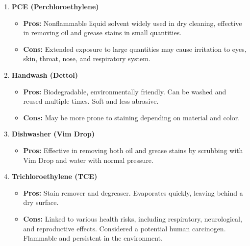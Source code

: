 \documentclass[table,french,english]{rapportCS}
\begin{document}
\begin{enumerate}
    \item \textbf{PCE (Perchloroethylene)}
    \begin{itemize}[label=$\bullet$]
        \item \textbf{Pros:} Nonflammable liquid solvent widely used in dry cleaning, effective in removing oil and grease stains in small quantities.
        \item \textbf{Cons:} Extended exposure to large quantities may cause irritation to eyes, skin, throat, nose, and respiratory system.
    \end{itemize}
    \newpage
    \item \textbf{Handwash (Dettol)}
    \begin{itemize}[label=$\bullet$]
        \item \textbf{Pros:} Biodegradable, environmentally friendly. Can be washed and reused multiple times. Soft and less abrasive.
        \item \textbf{Cons:} May be more prone to staining depending on material and color.
    \end{itemize}

    \item \textbf{Dishwasher (Vim Drop)}
    \begin{itemize}[label=$\bullet$]
        \item \textbf{Pros:} Effective in removing both oil and grease stains by scrubbing with Vim Drop and water with normal pressure.
    \end{itemize}

    \item \textbf{Trichloroethylene (TCE)}
    \begin{itemize}[label=$\bullet$]
        \item \textbf{Pros:} Stain remover and degreaser. Evaporates quickly, leaving behind a dry surface.
        \item \textbf{Cons:} Linked to various health risks, including respiratory, neurological, and reproductive effects. Considered a potential human  \gls{carcinogen}. Flammable and persistent in the environment.
    \end{itemize}


\end{enumerate}
\end{document}
